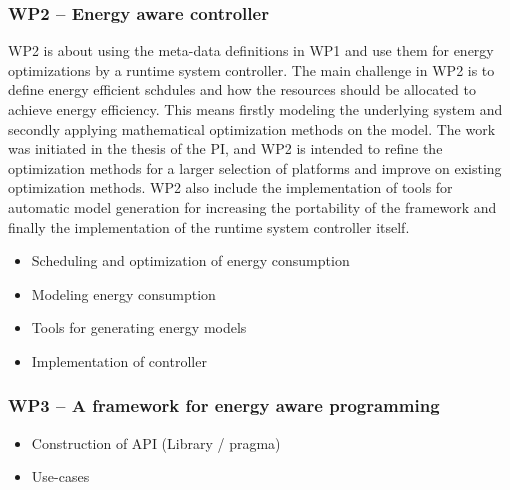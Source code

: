 \documentclass{article}
\begin{document}
\subsubsection{WP2 -- Energy aware controller}
WP2 is about using the meta-data definitions in WP1 and use them for energy optimizations by a runtime system controller.
The main challenge in WP2 is to define energy efficient schdules and how the resources should be allocated to achieve energy efficiency.
This means firstly modeling the underlying system and secondly applying mathematical optimization methods on the model.
The work was initiated in the thesis of the PI, and WP2 is intended to refine the optimization methods for a larger selection of platforms and improve on existing optimization methods.
WP2 also include the implementation of tools for automatic model generation for increasing the portability of the framework and finally the implementation of the runtime system controller itself.

\begin{itemize}
 \item Scheduling and optimization of energy consumption \vspace{-0.3cm}
 \item Modeling energy consumption \vspace{-0.3cm}
 \item Tools for generating energy models \vspace{-0.3cm}
 \item Implementation of controller
\end{itemize}

\subsubsection{WP3 -- A framework for energy aware programming}
\begin{itemize}
 \item Construction of API (Library / pragma)
 \item Use-cases
\end{itemize}
\end{document}
